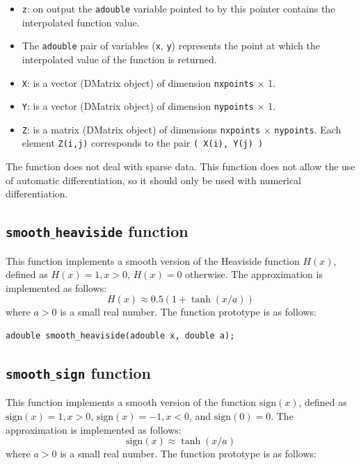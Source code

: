 \documentclass[a4paper,11pt]{report}    %
\begin{document}
\begin{itemize}
\item \verb|z|:  on output the \verb|adouble| variable pointed to by this pointer contains the interpolated function value.
\item  The \verb|adouble| pair of variables (\verb|x|, \verb|y|) represents the point at which the interpolated value of the function is returned.
\item  \verb|X|: is a vector (DMatrix object) of dimension \verb|nxpoints| $\times$ 1.
\item  \verb|Y|: is a vector (DMatrix object) of dimension \verb|nypoints| $\times$ 1.
\item  \verb|Z|: is a matrix (DMatrix object) of dimensions \verb|nxpoints| $\times$ \verb|nypoints|.  Each element \verb|Z(i,j)| corresponds to the pair \verb|( X(i), Y(j) )|
\end{itemize}


The function does not deal with sparse data. This function does not allow the use of automatic differentiation, so it should
only be used with numerical differentiation.



\subsection{ \texttt{smooth$\_$heaviside} function}

This function implements a smooth version of the Heaviside function
$H(x)$, defined as $H(x)=1, x>0$, $H(x)=0$ otherwise. The approximation
is implemented as follows:
\begin{equation}
   H(x) \approx  0.5( 1 + \tanh(x/a) )
\end{equation}
where $a>0$ is a small real number. The function prototype is as follows:


\begin{verbatim}
adouble smooth_heaviside(adouble x, double a);
\end{verbatim}


\subsection{ \texttt{smooth$\_$sign} function}

This function implements a smooth version of the function
$\mathrm{sign}(x)$, defined as $\mathrm{sign}(x)=1, x>0$, $\mathrm{sign}(x)=-1, x<0$, and $\mathrm{sign}(0)=0$. The approximation
is implemented as follows:
\begin{equation}
   \mathrm{sign}(x) \approx   \tanh(x/a) 
\end{equation}
where $a>0$ is a small real number. The function prototype is as follows:
\end{document}
